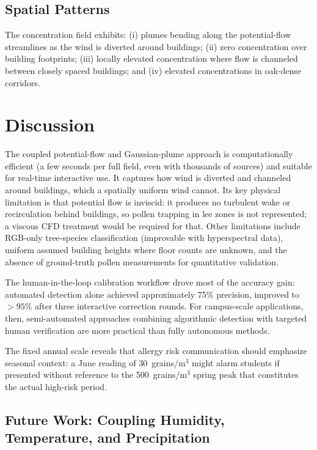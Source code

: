 \documentclass[11pt]{article}
\begin{document}
\subsection{Spatial Patterns}

The concentration field exhibits: (i) plumes bending along the potential-flow streamlines as the wind is diverted around buildings; (ii) zero concentration over building footprints; (iii) locally elevated concentration where flow is channeled between closely spaced buildings; and (iv) elevated concentrations in oak-dense corridors.

\section{Discussion}

The coupled potential-flow and Gaussian-plume approach is computationally efficient (a few seconds per full field, even with thousands of sources) and suitable for real-time interactive use. It captures how wind is diverted and channeled around buildings, which a spatially uniform wind cannot. Its key physical limitation is that potential flow is inviscid: it produces no turbulent wake or recirculation behind buildings, so pollen trapping in lee zones is not represented; a viscous CFD treatment would be required for that. Other limitations include RGB-only tree-species classification (improvable with hyperspectral data), uniform assumed building heights where floor counts are unknown, and the absence of ground-truth pollen measurements for quantitative validation.

The human-in-the-loop calibration workflow drove most of the accuracy gain: automated detection alone achieved approximately 75\% precision, improved to $>95\%$ after three interactive correction rounds. For campus-scale applications, then, semi-automated approaches combining algorithmic detection with targeted human verification are more practical than fully autonomous methods.

The fixed annual scale reveals that allergy risk communication should emphasize seasonal context: a June reading of 30~grains/m$^3$ might alarm students if presented without reference to the 500~grains/m$^3$ spring peak that constitutes the actual high-risk period.

\subsection{Future Work: Coupling Humidity, Temperature, and Precipitation}
\label{sec:futurework}
\end{document}
